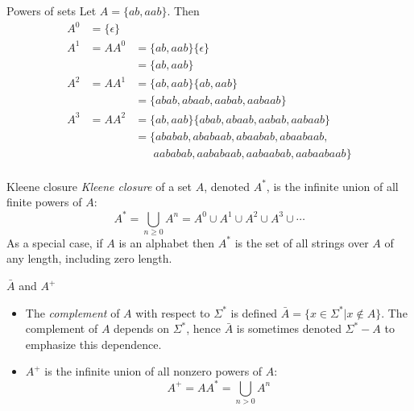 \documentclass[style=sailor,size=12pt]{powerdot}
\begin{document}
\begin{slide}[bm=,toc=]{Powers of sets}
Let $A = \{ab,aab\}$. Then
\[
\begin{array}{lll}
A^0 &= \{\epsilon\} & \\[2ex]

A^1 &= AA^0         &= \{ab,aab\}\{\epsilon\} \\
    &               &= \{ab,aab\} \\[2ex]

A^2 &= AA^1         &= \{ab,aab\}\{ab,aab\}   \\
    &               &= \{abab,abaab,aabab,aabaab\} \\[2ex]

A^3 &= AA^2         &= \{ab,aab\}\{abab,abaab,aabab,aabaab\}  \\
    &               &= \{ababab,ababaab,abaabab,abaabaab,  \\
    &               &\;\;\;\;\;\;aababab,aababaab,aabaabab,aabaabaab \}  \\
\end{array}
\]
\end{slide}


\begin{slide}[bm=,toc=]{Kleene closure}
\emph{Kleene closure} of a set $A$, denoted $A^*$, is the infinite union of all
finite powers of $A$:
\[
A^* = \bigcup_{n \geq 0} A^n = A^0 \cup A^1 \cup A^2 \cup A^3 \cup \cdots
\]
As a special case, if $A$ is an alphabet then $A^*$ is the set of all strings
over $A$ of any length, including zero length.
\end{slide}

\begin{slide}[bm=,toc=]{$\bar{A}$ and $A^+$}
\begin{itemize}
   \item The \emph{complement} of $A$ with respect to $\Sigma^*$ is defined 
         $\bar{A} = \{x \in \Sigma^* | x \notin A\}$. The complement of $A$
         depends on $\Sigma^*$, hence $\bar{A}$ is sometimes denoted 
         $\Sigma^* - A$ to emphasize this dependence.
   \item $A^+$ is the infinite union of all nonzero powers of $A$:
         \[
           A^+ = AA^* = \bigcup_{n>0} A^n
           \]
\end{itemize}
\end{slide}
\end{document}
